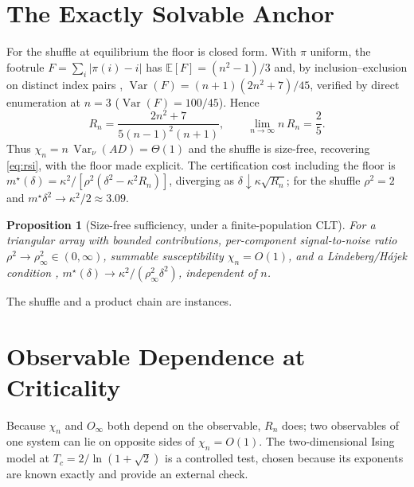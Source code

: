 \documentclass[11pt]{article}
\newtheorem{proposition}{Proposition}
\theoremstyle{definition}
\newcommand{\Var}{\operatorname{Var}}
\newcommand{\E}{\mathbb{E}}
\newcommand{\Rn}{R_n}
\begin{document}
\section{The Exactly Solvable Anchor}
For the shuffle at equilibrium the floor is closed form. With $\pi$ uniform, the footrule $F=\sum_i|\pi(i)-i|$ has $\E[F]=(n^2-1)/3$ and, by inclusion--exclusion on distinct index pairs \citep[App.~E]{rsi}, $\Var(F)=(n+1)(2n^2+7)/45$, verified by direct enumeration at $n=3$ ($\Var(F)=100/45$). Hence
\begin{equation}\label{eq:shufflefloor}
\Rn=\frac{2n^2+7}{5(n-1)^2(n+1)},\qquad \lim_{n\to\infty} n\,\Rn=\frac{2}{5}.
\end{equation}
Thus $\chi_n=n\,\Var_\nu(AD)=\Theta(1)$ and the shuffle is size-free, recovering \eqref{eq:rsi}, with the floor made explicit. The certification cost including the floor is $m^\star(\delta)=\kappa^2/\!\left[\rho^2(\delta^2-\kappa^2\Rn)\right]$, diverging as $\delta\downarrow\kappa\sqrt{\Rn}$; for the shuffle $\rho^2=2$ and $m^\star\delta^2\to\kappa^2/2\approx3.09$.

\begin{proposition}[Size-free sufficiency, under a finite-population CLT]\label{prop:suff}
For a triangular array with bounded contributions, per-component signal-to-noise ratio $\rho^2\to\rho^2_\infty\in(0,\infty)$, summable susceptibility $\chi_n=O(1)$, and a Lindeberg/H\'ajek condition \citep{hajek}, $m^\star(\delta)\to\kappa^2/(\rho^2_\infty\delta^2)$, independent of $n$.
\end{proposition}
The shuffle and a product chain are instances.

\section{Observable Dependence at Criticality}
Because $\chi_n$ and $O_\infty$ both depend on the observable, $\Rn$ does; two observables of one system can lie on opposite sides of $\chi_n=O(1)$. The two-dimensional Ising model at $T_c=2/\ln(1+\sqrt2)$ is a controlled test, chosen because its exponents are known exactly and provide an external check.
\end{document}
